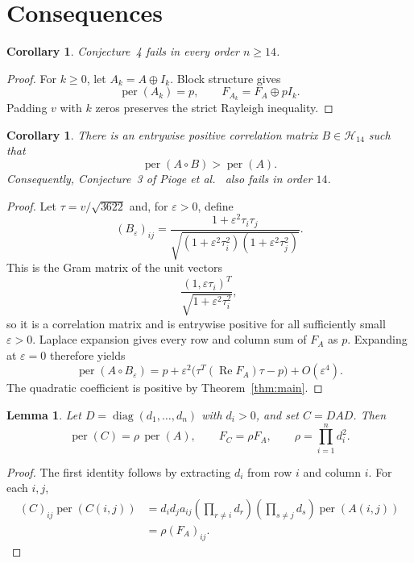 \documentclass[11pt]{amsart}
\newtheorem{lemma}[theorem]{Lemma}
\newtheorem{corollary}[theorem]{Corollary}
\newcommand{\HH}{\mathcal H}
\newcommand{\permanent}{\operatorname{per}}
\newcommand{\Real}{\operatorname{Re}}
\begin{document}
\section{Consequences}

\begin{corollary}\label{cor:orders}
Conjecture~4 fails in every order $n\geq14$.
\end{corollary}

\begin{proof}
For $k\geq0$, let $A_k=A\oplus I_k$. Block structure gives
\[
  \permanent(A_k)=p,
  \qquad
  F_{A_k}=F_A\oplus pI_k.
\]
Padding $v$ with $k$ zeros preserves the strict Rayleigh inequality.
\end{proof}

\begin{corollary}\label{cor:conjecture-three}
There is an entrywise positive correlation matrix $B\in\HH_{14}$ such
that
\[
  \permanent(A\circ B)>\permanent(A).
\]
Consequently, Conjecture~3 of Pioge et al.~\cite{PiogeEtAl} also fails
in order $14$.
\end{corollary}

\begin{proof}
Let $\tau=v/\sqrt{3622}$ and, for $\varepsilon>0$, define
\[
  (B_\varepsilon)_{ij}
  =\frac{1+\varepsilon^2\tau_i\tau_j}
  {\sqrt{(1+\varepsilon^2\tau_i^2)
         (1+\varepsilon^2\tau_j^2)}}.
\]
This is the Gram matrix of the unit vectors
\[
  \frac{(1,\varepsilon\tau_i)^T}
       {\sqrt{1+\varepsilon^2\tau_i^2}},
\]
so it is a correlation matrix and is entrywise positive for all
sufficiently small $\varepsilon>0$. Laplace expansion gives every row
and column sum of $F_A$ as $p$. Expanding at $\varepsilon=0$ therefore
yields
\[
  \permanent(A\circ B_\varepsilon)
  =p+\varepsilon^2
  \bigl(\tau^T(\Real F_A)\tau-p\bigr)+O(\varepsilon^4).
\]
The quadratic coefficient is positive by Theorem~\ref{thm:main}.
\end{proof}

\begin{lemma}\label{lem:congruence}
Let $D=\operatorname{diag}(d_1,\ldots,d_n)$ with $d_i>0$, and set
$C=DAD$. Then
\[
  \permanent(C)=\rho\,\permanent(A),
  \qquad
  F_C=\rho F_A,
  \qquad
  \rho=\prod_{i=1}^n d_i^2.
\]
\end{lemma}

\begin{proof}
The first identity follows by extracting $d_i$ from row $i$ and column
$i$. For each $i,j$,
\[
\begin{aligned}
(C)_{ij}\permanent(C(i,j))
&=d_i d_j a_{ij}
  \left(\prod_{r\neq i}d_r\right)
  \left(\prod_{s\neq j}d_s\right)
  \permanent(A(i,j))\\
&=\rho(F_A)_{ij}.
\end{aligned}
\]
\end{proof}
\end{document}
